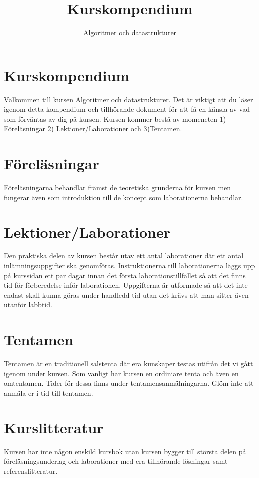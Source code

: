 \documentclass{article}
\begin{document}
  \title{Kurskompendium }
  \author{ Algoritmer och datastrukturer }
  \date{}
  \maketitle


  \section*{Kurskompendium}
   Välkommen till kursen Algoritmer och datastrukturer. Det är viktigt att du läser igenom detta kompendium och tillhörande dokument för att få en känsla av vad som förväntas av dig på kursen. Kursen kommer bestå av momeneten 1) Föreläsningar 2) Lektioner/Laborationer och 3)Tentamen.



  \section*{Föreläsningar
  }

  Föreläsningarna behandlar främst de teoretiska grunderna för kursen men fungerar även som
  introduktion till de koncept som laborationerna behandlar.
  
  \section*{Lektioner/Laborationer
    }
  Den praktiska delen av kursen består utav ett antal laborationer där ett antal inlämningsuppgifter
  ska genomföras. Instruktionerna till laborationerna läggs upp på kurssidan ett par dagar innan
  det första laborationstillfället så att det finns tid för förberedelse inför laborationen.
  Uppgifterna är utformade så att det inte endast skall kunna göras under handledd tid utan det krävs att man sitter även utanför labbtid.
  
  \section*{Tentamen}
  Tentamen är en traditionell salstenta där era kunskaper testas utifrån det vi gått igenom
  under kursen. Som vanligt har kursen en ordiniare tenta och även en omtentamen. Tider för
  dessa finns under tentamensanmälningarna. Glöm inte att anmäla er i tid till tentamen.
  
  \section*{Kurslitteratur
  }
  Kursen har inte någon enskild kursbok utan kursen bygger till största delen på föreläsningsunderlag
  och laborationer med era tillhörande lösningar samt referenslitteratur.
  
\end{document}
